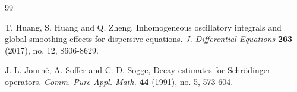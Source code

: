 \documentclass[11pt,reqno]{amsart}
\numberwithin{equation}{section}
\theoremstyle{definition}
\begin{document}
\begin{thebibliography}{99}

%


 T. Huang, S. Huang and Q. Zheng, Inhomogeneous oscillatory integrals and global smoothing effects for dispersive equations. \textit{J. Differential Equations} \textbf{263} (2017), no. 12, 8606-8629.








 J. L. Journ\'{e}, A. Soffer and C. D. Sogge, Decay estimates for Schr\"{o}dinger operators. \textit{Comm. Pure Appl. Math.} \textbf{44} (1991), no. 5, 573-604.




\end{thebibliography}
\end{document}
